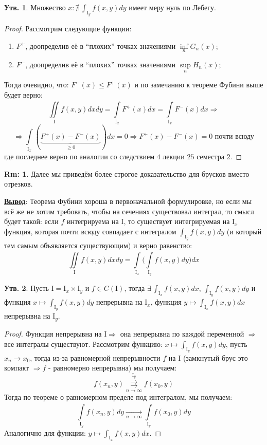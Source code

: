 \documentclass[12pt]{article}
\newcommand{\MI}{\mathrm{I}}
\theoremstyle{definition}
\newtheorem{rem}{Rm:}
\newtheorem{prop}{Утв.}
\newcommand{\ddint}[2]{\displaystyle\int\limits_{#1}^{#2}}
\newcommand{\uconvm}[2]{\overset{#1}{\underset{#2}{\rightrightarrows}}}
\begin{document}
\begin{prop}
	Множество $x \colon \nexists \, \int_{\MI_y}f(x,y)dy$ имеет меру нуль по Лебегу.
\end{prop}

\begin{proof}
	Рассмотрим следующие функции:
	\begin{enumerate}[label=\arabic*)]
		\item $F^+$, доопределив её в ``плохих'' точках значениями $\inf\limits_n G_n(x)$;
		\item $F^-$, доопределив её в ``плохих'' точках значениями $\sup\limits_n H_n(x)$;
	\end{enumerate}
	Тогда очевидно, что: $F^{-}(x) \leq F^{+}(x)$ и по замечанию к теореме Фубини выше будет верно:
	$$
		\iint\limits_{\MI}f(x,y)dxdy = \ddint{\MI_x}{}F^+(x)dx =  \ddint{\MI_x}{}F^-(x)dx \Rightarrow
	$$
	$$
		\Rightarrow \ddint{\MI_x}{}(\underbrace{F^+(x) - F^-(x)}_{\geq 0})dx = 0 \Rightarrow F^+(x) - F^-(x) = 0 \text{ почти всюду}
	$$
	где последнее верно по аналогии со следствием $4$ лекции $25$ семестра $2$.
\end{proof}
\begin{rem}
	Далее мы приведём более строгое доказательство для брусков вместо отрезков.
\end{rem}

\textbf{\uline{Вывод}}: Теорема Фубини хороша в первоначальной формулировке, но если мы всё же не хотим требовать, чтобы на сечениях существовал интеграл, то смысл будет такой: если $f$ интегрируема на $\MI$, то существует интегрируемая на $\MI_x$ функция, которая почти всюду совпадает с интегралом $\int_{\MI_y}f(x,y)dy$ (и который тем самым объявляется существующим) и верно равенство:
$$
	\iint\limits_{\MI}f(x,y)dxdy = \ddint{\MI_x}{}\bigg(\ddint{\MI_y}{}f(x,y)dy\bigg)dx
$$ 

\begin{prop}
	Пусть $\MI = \MI_x \times \MI_y$ и $f \in C(\MI)$, тогда $\exists \, \int_{\MI_x}f(x,y)dx, \, \int_{\MI_y}f(x,y)dy$ и функция $x \mapsto \int_{\MI_y}f(x,y)dy$ непрерывна на $\MI_x$, функция $y \mapsto \int_{\MI_x}f(x,y)dx$ непрерывна на $\MI_y$.
\end{prop}
\begin{proof}
	Функция непрерывна на $\MI \Rightarrow$ она непрерывна по каждой переменной $\Rightarrow$ все интегралы существуют. Рассмотрим функцию: $x \mapsto \int_{\MI_y}f(x,y)dy$, пусть $x_n \to x_0$, тогда из-за равномерной непрерывности $f$ на $\MI$ (замкнутый брус это компакт $\Rightarrow f$ - равномерно непрерывна) мы получаем:
	$$
		f(x_n,y)\uconvm{\MI_y}{n \to \infty} f(x_0,y)
	$$
	Тогда по теореме о равномерном пределе под интегралом, мы получаем:
	$$
		\ddint{\MI_y}{}f(x_n,y)dy \xrightarrow[n \to \infty]{} \ddint{\MI_y}{}f(x_0,y)dy
	$$
	Аналогично для функции: $y \mapsto \int_{\MI_x}f(x,y)dx$.
\end{proof}
\end{document}
